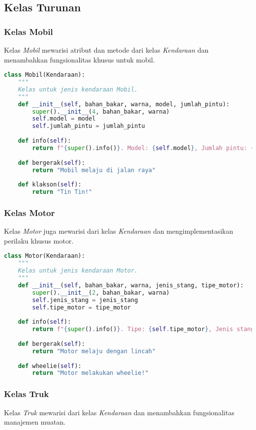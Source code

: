 \documentclass[12pt]{article}
\begin{document}
\subsection{Kelas Turunan}
\subsubsection{Kelas Mobil}
Kelas \textit{Mobil} mewarisi atribut dan metode dari kelas \textit{Kendaraan} dan menambahkan fungsionalitas khusus untuk mobil.

\begin{lstlisting}[language=Python, caption=Implementasi Kelas Mobil]
class Mobil(Kendaraan):
    """
    Kelas untuk jenis kendaraan Mobil.
    """
    def __init__(self, bahan_bakar, warna, model, jumlah_pintu):
        super().__init__(4, bahan_bakar, warna)
        self.model = model
        self.jumlah_pintu = jumlah_pintu
    
    def info(self):
        return f"{super().info()}. Model: {self.model}, Jumlah pintu: {self.jumlah_pintu}"
    
    def bergerak(self):
        return "Mobil melaju di jalan raya"
    
    def klakson(self):
        return "Tin Tin!"
\end{lstlisting}

\subsubsection{Kelas Motor}
Kelas \textit{Motor} juga mewarisi dari kelas \textit{Kendaraan} dan mengimplementasikan perilaku khusus motor.

\begin{lstlisting}[language=Python, caption=Implementasi Kelas Motor]
class Motor(Kendaraan):
    """
    Kelas untuk jenis kendaraan Motor.
    """
    def __init__(self, bahan_bakar, warna, jenis_stang, tipe_motor):
        super().__init__(2, bahan_bakar, warna)
        self.jenis_stang = jenis_stang
        self.tipe_motor = tipe_motor
    
    def info(self):
        return f"{super().info()}. Tipe: {self.tipe_motor}, Jenis stang: {self.jenis_stang}"
    
    def bergerak(self):
        return "Motor melaju dengan lincah"
    
    def wheelie(self):
        return "Motor melakukan wheelie!"
\end{lstlisting}

\subsubsection{Kelas Truk}
Kelas \textit{Truk} mewarisi dari kelas \textit{Kendaraan} dan menambahkan fungsionalitas manajemen muatan.
\end{document}
